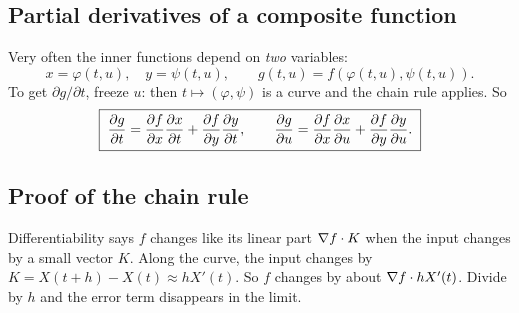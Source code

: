 \subsection{Partial derivatives of a composite function}

Very often the inner functions depend on \emph{two} variables:
\[ x=\varphi(t,u),\quad y=\psi(t,u),\qquad g(t,u)=f(\varphi(t,u),\psi(t,u)). \]
To get $\partial g/\partial t$, freeze $u$: then $t\mapsto(\varphi,\psi)$ is a curve and
the chain rule applies. So
\[
\boxed{\;\frac{\partial g}{\partial t}=\frac{\partial f}{\partial x}\frac{\partial x}{\partial t}+\frac{\partial f}{\partial y}\frac{\partial y}{\partial t},\qquad \frac{\partial g}{\partial u}=\frac{\partial f}{\partial x}\frac{\partial x}{\partial u}+\frac{\partial f}{\partial y}\frac{\partial y}{\partial u}.\;}
\]

\begin{center}
\end{center}

\subsection{Proof of the chain rule}

\begin{intuition}
Differentiability says $f$ changes like its linear part $\nabla f\cdot K$ when the input
changes by a small vector $K$. Along the curve, the input changes by
$K=X(t+h)-X(t)\approx hX'(t)$. So $f$ changes by about $\nabla f\cdot hX'(t)$. Divide by
$h$ and the error term disappears in the limit.
\end{intuition}

